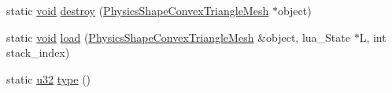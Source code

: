 \begin{DoxyCompactItemize}
\item 
static \mbox{\hyperlink{_thread_8h_af1e856da2e658414cb2456cb6f7ebc66}{void}} \mbox{\hyperlink{classnjli_1_1_physics_shape_convex_triangle_mesh_aa5c6e79a23fc865fc1f1bef9a943fafc}{destroy}} (\mbox{\hyperlink{classnjli_1_1_physics_shape_convex_triangle_mesh}{Physics\+Shape\+Convex\+Triangle\+Mesh}} $\ast$object)
\item 
static \mbox{\hyperlink{_thread_8h_af1e856da2e658414cb2456cb6f7ebc66}{void}} \mbox{\hyperlink{classnjli_1_1_physics_shape_convex_triangle_mesh_ae14ef3bb61a75e7964ff58a82ec4847f}{load}} (\mbox{\hyperlink{classnjli_1_1_physics_shape_convex_triangle_mesh}{Physics\+Shape\+Convex\+Triangle\+Mesh}} \&object, lua\+\_\+\+State $\ast$L, int stack\+\_\+index)
\item 
static \mbox{\hyperlink{_util_8h_a10e94b422ef0c20dcdec20d31a1f5049}{u32}} \mbox{\hyperlink{classnjli_1_1_physics_shape_convex_triangle_mesh_a6a96f7fe730935004042f2a74c1e0bf8}{type}} ()
\end{DoxyCompactItemize}
